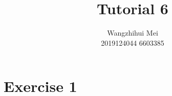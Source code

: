 \documentclass[12pt]{article}%
\begin{document}
\title{Tutorial 6}
\author{Wangzhihui Mei \\ 2019124044 6603385}
\date{}
\maketitle

\section*{Exercise 1}
\end{document}
